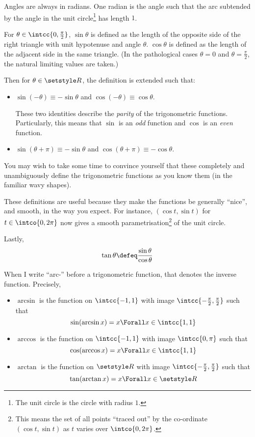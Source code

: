 Angles are always in radians. One radian is the angle such that the arc
subtended by the angle in the unit circle\footnote{
 The unit circle is the circle with radius \(1\).
} has length \(1\).

For \(\theta \in \intcc{0, \frac \pi 2}\), \(\sin \theta\) is defined as the
length of the opposite side of the right triangle with unit hypotenuse and angle
\(\theta\). \(\cos \theta\) is defined as the length of the adjacent side in the
same triangle. (In the pathological cases \(\theta = 0\) and
\(\theta = \frac \pi 2\), the natural limiting values are taken.)

Then for \(\theta \in \Reals\), the definition is extended such that:
\begin{itemize}
 \item
  \(\sin(-\theta) \equiv -\sin \theta\) and
  \(\cos(-\theta) \equiv \cos \theta\).

  These two identities describe the \emph{parity} of the trigonometric
  functions. Particularly, this means that \(\sin\) is an \emph{odd} function
  and \(\cos\) is an \emph{even} function.
 \item
  \(\sin(\theta + \pi) \equiv -\sin \theta\) and
  \(\cos(\theta + \pi) \equiv -\cos \theta\).
\end{itemize}
You may wish to take some time to convince yourself that these completely and
unambiguously define the trigonometric functions as you know them (in the
familiar wavy shapes).

These definitions are useful because they make the functions be generally
``nice'', and smooth, in the way you expect. For instance,
\((\cos t, \sin t)\) for \(t \in \intco{0, 2\pi}\) now gives a smooth
parametrisation\footnote{
 This means the set of all points ``traced out'' by the co-ordinate
 \((\cos t, \sin t)\) as \(t\) varies over
 \(\intco{0, 2\pi}\).
} of the unit circle.

Lastly,
\begin{equation*}
 \tan \theta \defeq \frac{\sin \theta}{\cos \theta}
\end{equation*}

When I write ``arc-'' before a trigonometric function, that denotes the inverse
function. Precisely,
\begin{itemize}
 \item
  \(\arcsin\) is the function on \(\intcc{-1, 1}\) with image
  \(\intcc{-\frac \pi 2, \frac \pi 2}\) such that
  \begin{equation*}
   \sin(\arcsin x) = x \Forall x \in \intcc{1, 1}
  \end{equation*}
 \item
  \(\arccos\) is the function on \(\intcc{-1, 1}\) with image
  \(\intcc{0, \pi}\) such that
  \begin{equation*}
   \cos(\arccos x) = x \Forall x \in \intcc{1, 1}
  \end{equation*}
 \item
  \(\arctan\) is the function on \(\Reals\) with image
  \(\intcc{-\frac \pi 2, \frac \pi 2}\) such that
  \begin{equation*}
   \tan(\arctan x) = x \Forall x \in \Reals
  \end{equation*}
\end{itemize}

